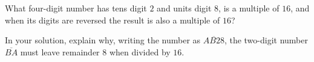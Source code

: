 What four-digit number has tens digit $2$ and units digit $8$, is a multiple of $16$, and when its digits are reversed the result is also a multiple of $16$?

In your solution, explain why, writing the number as $\overline{AB28}$, the two-digit number $\overline{BA}$ must leave remainder $8$ when divided by $16$.
